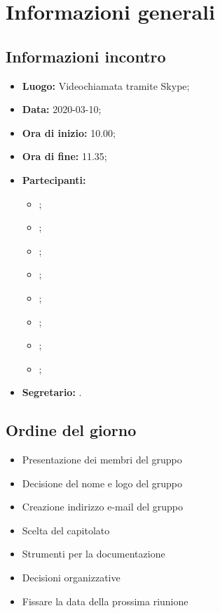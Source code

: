 \section{Informazioni generali}
\subsection{Informazioni incontro}
\begin{itemize}
	\item \textbf{Luogo:} Videochiamata tramite Skype; 
	\item \textbf{Data:} 2020-03-10; 
	\item \textbf{Ora di inizio:} 10.00; 
	\item \textbf{Ora di fine:} 11.35; 
	\item \textbf{Partecipanti:}
		\begin{itemize}
			\item \VB; 
			\item \LB; 
			\item \NF; 
			\item \EG; 
			\item \FJ; 
			\item \MP; 
			\item \AS; 
			\item \AZ; 
		\end{itemize}
	\item \textbf{Segretario:} \EG. 
\end{itemize}

\subsection{Ordine del giorno}
\begin{itemize}
	\item Presentazione dei membri del gruppo 
	\item Decisione del nome e logo del gruppo 
	\item Creazione indirizzo e-mail del gruppo
	\item Scelta del capitolato
	\item Strumenti per la documentazione
	\item Decisioni organizzative
	\item Fissare la data della prossima riunione
\end{itemize}
